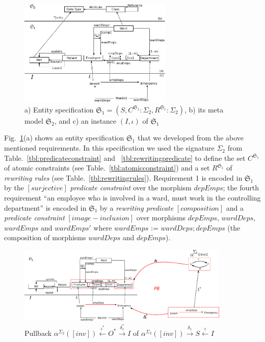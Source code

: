 \documentclass{eceasst}
\begin{document}
\begin{figure}[h]
\centering
 \includegraphics[width=0.65\textwidth]{entity-1.pdf}
 \caption{ a) Entity specification $\mathfrak{S}_1 = (S, C^{\mathfrak{S}_1} : \Sigma_2 , R^{\mathfrak{S}_1} : \Sigma_2)$, b) its meta model $\mathfrak{S}_2$, and c) an instance $(I,\iota)$ of $\mathfrak{S}_1$}
 \label{fig:entity-diagram}
 \end{figure}

Fig.~\ref{fig:entity-diagram}(a) shows an entity specification $\mathfrak{S}_1$ that we developed from the above mentioned requirements. 
In this specification we used the signature $\Sigma_2$ from Table.~\ref{tbl:predicateconstraint} and ~\ref{tbl:rewritingpredicate} to define the set $C^{\mathfrak{S}_1}$ of atomic constraints 
(see Table.~\ref{tbl:atomicconstraint}) and a set $R^{\mathfrak{S}_1}$ of \textit{rewriting rules} (see Table.~\ref{tbl:rewritingrules}). 
Requirement 1 is encoded in $\mathfrak{S}_1$ by the $[surjective]$ \textit{predicate constraint} over the morphism $depEmps$; 
the fourth requirement ``an employee who is involved in a ward, must work in the controlling department'' is encoded in $\mathfrak{S}_1$ by a \textit{rewriting predicate} $[composition]$ 
and a \textit{predicate constraint} $[image-inclusion]$ over morphisms $depEmps$, $wardDeps$, $wardEmps$ and $wardEmps'$ where $wardEmps$ := $wardDeps; depEmps$ 
(the composition of morphisms $wardDeps$ and $depEmps$).

\begin{figure}[t]
\centering
 \includegraphics[width=0.9\textwidth]{entity-1-pullback.pdf}
 \caption{ Pullback $\alpha^{\Sigma_2}([inv]) \xleftarrow{\iota^*} O^* \xrightarrow{\delta_1^*} I $ of $\alpha^{\Sigma_2}([inv]) \xrightarrow{\delta_1} S \xleftarrow{\iota} I $ }
 \label{fig:entity-pb}
 \end{figure}
 
\end{document}
